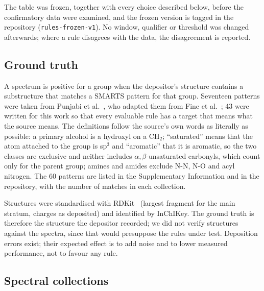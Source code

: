 The table was frozen, together with every choice described below, before the confirmatory data were examined, and the frozen version is tagged in the repository (\texttt{rules-frozen-v1}). No window, qualifier or threshold was changed afterwards; where a rule disagrees with the data, the disagreement is reported.

\subsection{Ground truth}
\label{sec:truth}

A spectrum is positive for a group when the depositor's structure contains a substructure that matches a SMARTS pattern for that group. Seventeen patterns were taken from Punjabi et al.~\cite{punjabi2025chemotion}, who adapted them from Fine et al.~\cite{fine2020spectral}; 43 were written for this work so that every evaluable rule has a target that means what the source means. The definitions follow the source's own words as literally as possible: a primary alcohol is a hydroxyl on a CH$_2$; ``saturated'' means that the atom attached to the group is sp$^3$ and ``aromatic'' that it is aromatic, so the two classes are exclusive and neither includes $\alpha,\beta$-unsaturated carbonyls, which count only for the parent group; amines and amides exclude N-N, N-O and acyl nitrogen. The 60 patterns are listed in the Supplementary Information and in the repository, with the number of matches in each collection.

Structures were standardised with RDKit~\cite{rdkit} (largest fragment for the main stratum, charges as deposited) and identified by InChIKey. The ground truth is therefore the structure the depositor recorded; we did not verify structures against the spectra, since that would presuppose the rules under test. Deposition errors exist; their expected effect is to add noise and to lower measured performance, not to favour any rule.

\subsection{Spectral collections}
\label{sec:data}

